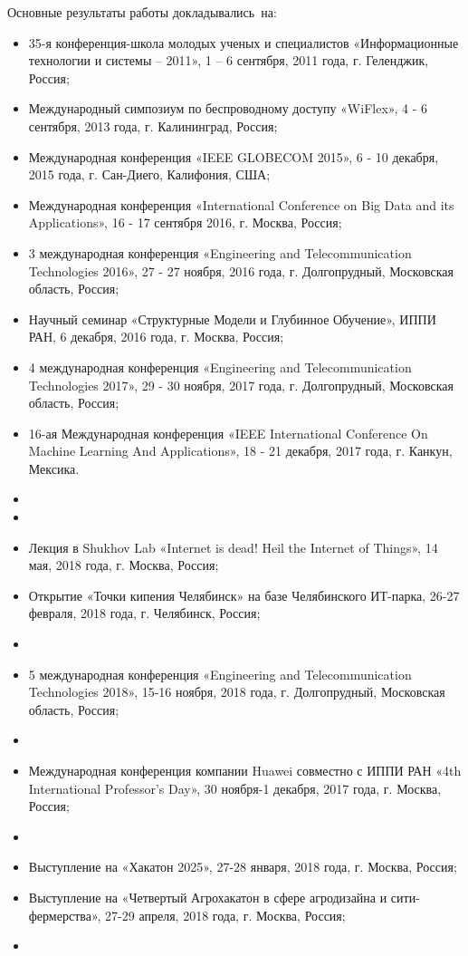 {\probation}
Основные результаты работы докладывались~на:
\begin{itemize}
\item 35-я конференция-школа молодых ученых и специалистов «Информационные технологии и системы – 2011», 1 – 6 сентября, 2011 года, г. Геленджик, Россия;
\item Международный симпозиум по беспроводному доступу «WiFlex», 4 - 6 сентября,  2013 года, г. Калининград, Россия;
\item Международная конференция «IEEE GLOBECOM 2015», 6 - 10 декабря, 2015 года, г. Сан-Диего, Калифония, США;
\item Международная конференция «International Conference on Big Data and its Applications», 16 - 17 сентября 2016, г. Москва, Россия;
\item 3 международная конференция «Engineering and Telecommunication Technologies 2016», 27 - 27 ноября, 2016 года, г. Долгопрудный, Московская область, Россия;
\item Научный семинар «Структурные Модели и Глубинное Обучение», ИППИ РАН, 6 декабря, 2016 года, г. Москва, Россия;
\item 4 международная конференция «Engineering and Telecommunication Technologies 2017», 29 - 30 ноября, 2017 года, г. Долгопрудный, Московская область, Россия;
\item 16-ая Международная конференция «IEEE International Conference On Machine Learning And Applications», 18 - 21 декабря, 2017 года, г. Канкун, Мексика.
\item {}
\item {}
\item Лекция в Shukhov Lab «Internet is dead! Heil the Internet of Things», 14 мая, 2018 года, г. Москва, Россия;
\item Открытие «Точки кипения Челябинск» на базе Челябинского ИТ-парка, 26-27 февраля, 2018 года, г. Челябинск, Россия;
\item {}
\item 5 международная конференция «Engineering and Telecommunication Technologies 2018», 15-16 ноября, 2018 года, г. Долгопрудный, Московская область, Россия;
\item {}
\item Международная конференция компании Huawei совместно с ИППИ РАН «4th International Professor’s Day», 30 ноября-1 декабря, 2017 года, г. Москва, Россия;
\item {}
\item Выступление на «Хакатон 2025», 27-28 января, 2018 года, г. Москва, Россия;
\item Выступление на «Четвертый Агрохакатон в сфере агродизайна и сити-фермерства», 27-29 апреля, 2018 года, г. Москва, Россия;
\item {}

\end{itemize}

